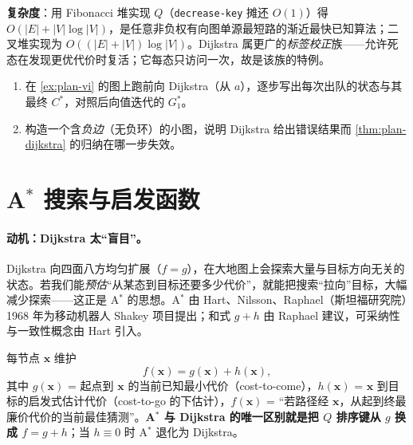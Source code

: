 \noindent\textbf{复杂度}：用 Fibonacci 堆实现 $Q$（\texttt{decrease-key} 摊还 $O(1)$）得 $O(|E|+|V|\log|V|)$，是任意非负权有向图单源最短路的渐近最快已知算法；二叉堆实现为 $O((|E|+|V|)\log|V|)$。Dijkstra 属更广的\emph{标签校正}族——允许死态在发现更优代价时复活；它每态只访问一次，故是该族的特例。

\begin{practice}
\begin{enumerate}
  \item 在 \cref{ex:plan-vi} 的图上跑前向 Dijkstra（从 $a$），逐步写出每次出队的状态与其最终 $C^*$，对照后向值迭代的 $G_1^*$。
  \item 构造一个含\emph{负边}（无负环）的小图，说明 Dijkstra 给出错误结果而 \cref{thm:plan-dijkstra} 的归纳在哪一步失效。
\end{enumerate}
\end{practice}

\section{A\texorpdfstring{$^*$}{^*} 搜索与启发函数}
\label{sec:plan-astar}

\paragraph{动机：Dijkstra 太“盲目”。}
Dijkstra 向四面八方均匀扩展（$f=g$），在大地图上会探索大量与目标方向无关的状态。若我们能\emph{预估}“从某态到目标还要多少代价”，就能把搜索“拉向”目标，大幅减少探索——这正是 A$^*$ 的思想。A$^*$ 由 Hart、Nilsson、Raphael（斯坦福研究院）1968 年为移动机器人 Shakey 项目提出\cite{hart1968astar}；和式 $g+h$ 由 Raphael 建议，可采纳性与一致性概念由 Hart 引入。

\begin{definition}[A$^*$ 评价函数]\label{def:plan-astar}
每节点 $\mathbf{x}$ 维护
\begin{equation}
  f(\mathbf{x})=g(\mathbf{x})+h(\mathbf{x}),
  \label{eq:plan-fgh}
\end{equation}
其中 $g(\mathbf{x})$ = 起点到 $\mathbf{x}$ 的当前已知最小代价（cost-to-come），$h(\mathbf{x})$ = $\mathbf{x}$ 到目标的启发式估计代价（cost-to-go 的下估计），$f(\mathbf{x})$ = “若路径经 $\mathbf{x}$，从起到终最廉价代价的当前最佳猜测”。\textbf{A$^*$ 与 Dijkstra 的唯一区别就是把 $Q$ 排序键从 $g$ 换成 $f=g+h$}；当 $h\equiv0$ 时 A$^*$ 退化为 Dijkstra。
\end{definition}

